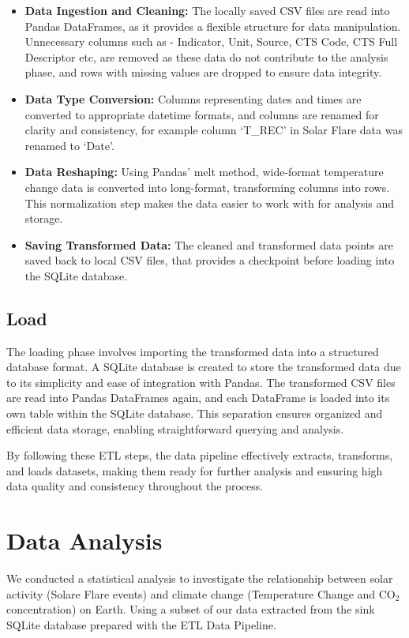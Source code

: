 \documentclass{article}
\begin{document}
\begin{itemize}
    \item \textbf{Data Ingestion and Cleaning:} The locally saved CSV files are read into Pandas DataFrames, as it provides a flexible structure for data manipulation. Unnecessary columns such as - Indicator, Unit, Source, CTS Code, CTS Full Descriptor etc, are removed as these data do not contribute to the analysis phase, and rows with missing values are dropped to ensure data integrity.
    \item \textbf{Data Type Conversion:} Columns representing dates and times are converted to appropriate datetime formats, and columns are renamed for clarity and consistency, for example column `T\_REC' in Solar Flare data was renamed to `Date'.
    \item \textbf{Data Reshaping:} Using Pandas' melt method, wide-format temperature change data is converted into long-format, transforming columns into rows. This normalization step makes the data easier to work with for analysis and storage.
    \item \textbf{Saving Transformed Data:} The cleaned and transformed data points are saved back to local CSV files, that provides a checkpoint before loading into the SQLite database.
\end{itemize}


\subsection{Load}

The loading phase involves importing the transformed data into a structured database format. A SQLite database is created to store the transformed data due to its simplicity and ease of integration with Pandas. The transformed CSV files are read into Pandas DataFrames again, and each DataFrame is loaded into its own table within the SQLite database. This separation ensures organized and efficient data storage, enabling straightforward querying and analysis.

By following these ETL steps, the data pipeline effectively extracts, transforms, and loads datasets, making them ready for further analysis and ensuring high data quality and consistency throughout the process.

\section{Data Analysis}

We conducted a statistical analysis to investigate the relationship between solar activity (Solare Flare events) and climate change (Temperature Change and CO$_2$ concentration) on Earth. Using a subset of our data extracted from the sink SQLite database prepared with the ETL Data Pipeline. 
\end{document}
